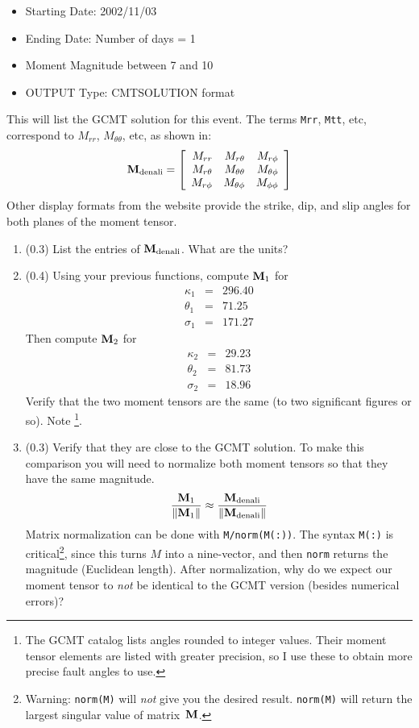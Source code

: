 \documentclass[11pt,titlepage,fleqn]{article}
\begin{document}
\begin{enumerate}
\begin{itemize}
\item Starting Date: 2002/11/03
\item Ending Date: Number of days = 1
\item Moment Magnitude between 7 and 10
\item OUTPUT Type: CMTSOLUTION format
\end{itemize}
%
This will list the GCMT solution for this event. The terms \verb+Mrr+, \verb+Mtt+, etc, correspond to $M_{rr}$, $M_{\theta\theta}$, etc, as shown in:
%
\begin{equation}
\mbox{${\bf M}$}_{\rm denali} =
\left[ \begin{array}{rrr}
   M_{rr}     &  M_{r\theta}     & M_{r\phi}  \\
   M_{r\theta}  &  M_{\theta\theta} &  M_{\theta\phi}  \\
   M_{r\phi}   &  M_{\theta\phi}   &  M_{\phi\phi}
\end{array} \right]
\end{equation}
%
Other display formats from the website provide the strike, dip, and slip angles for both planes of the moment tensor.

\begin{enumerate}
\item (0.3) List the entries of $\mbox{${\bf M}$}_{\rm denali}$. What are the units?

\item (0.4) Using your previous functions, compute $\mbox{${\bf M}$}_1$ for 
%
\begin{eqnarray*}
\kappa_1 &=& 296.40
\\
\theta_1 &=& 71.25
\\
\sigma_1 &=& 171.27
\end{eqnarray*}
%
Then compute $\mbox{${\bf M}$}_2$ for
%
\begin{eqnarray*}
\kappa_2 &=& 29.23
\\
\theta_2 &=& 81.73
\\
\sigma_2 &=& 18.96
\end{eqnarray*}
%
 Verify that the two moment tensors are the same (to two significant figures or so). Note \footnote{The GCMT catalog lists angles rounded to integer values. Their moment tensor elements are listed with greater precision, so I use these to obtain more precise fault angles to use.}.

\item (0.3) Verify that they are close to the GCMT solution. To make this comparison you will need to normalize both moment tensors so that they have the same magnitude.
%
\begin{equation}
\frac{\mbox{${\bf M}$}_1}{\|\mbox{${\bf M}$}_1\|} \approx \frac{\mbox{${\bf M}$}_{\rm denali} }{\|\mbox{${\bf M}$}_{\rm denali}\|}
\end{equation}
%
Matrix normalization can be done with \verb+M/norm(M(:))+. The syntax \verb+M(:)+ is critical\footnote{Warning: {\tt norm(M)} will {\em not} give you the desired result. {\tt norm(M)} will return the largest singular value of matrix~$\mbox{${\bf M}$}$.}, since this turns $M$ into a nine-vector, and then \verb+norm+ returns the magnitude (\ie Euclidean length). After normalization, why do we expect our moment tensor to {\em not} be identical to the GCMT version (besides numerical errors)?


\end{enumerate}
\end{enumerate}
\end{document}
